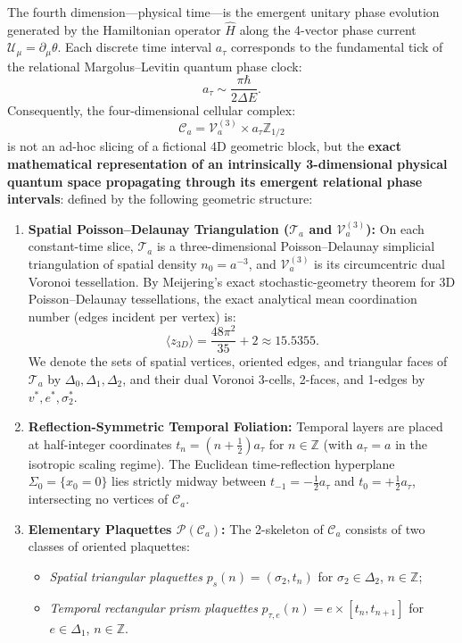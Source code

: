\documentclass[11pt, a4paper]{article}
\theoremstyle{definition}
\theoremstyle{remark}
\begin{document}
The fourth dimension—physical time—is the emergent unitary phase evolution generated by the Hamiltonian operator $\hat{H}$ along the 4-vector phase current $\mathcal{U}_{\mu} = \partial_{\mu}\theta$. Each discrete time interval $a_{\tau}$ corresponds to the fundamental tick of the relational Margolus--Levitin quantum phase clock:
\begin{equation}
  a_{\tau} \sim \frac{\pi\hbar}{2\Delta E}.
\end{equation}
Consequently, the four-dimensional cellular complex:
\begin{equation}
  \mathcal{C}_{a} = \mathcal{V}_{a}^{(3)} \times a_{\tau}\mathbb{Z}_{1/2}
\end{equation}
is not an ad-hoc slicing of a fictional 4D geometric block, but the \textbf{exact mathematical representation of an intrinsically 3-dimensional physical quantum space propagating through its emergent relational phase intervals}:
defined by the following geometric structure:
\begin{enumerate}
  \item \textbf{Spatial Poisson--Delaunay Triangulation ($\mathcal{T}_{a}$ and $\mathcal{V}_{a}^{(3)}$):} On each constant-time slice, $\mathcal{T}_{a}$ is a three-dimensional Poisson--Delaunay simplicial triangulation of spatial density $n_{0} = a^{-3}$, and $\mathcal{V}_{a}^{(3)}$ is its circumcentric dual Voronoi tessellation. By Meijering's exact stochastic-geometry theorem for 3D Poisson--Delaunay tessellations, the exact analytical mean coordination number (edges incident per vertex) is:
  \begin{equation}
    \langle z_{3D} \rangle = \frac{48\pi^{2}}{35} + 2 \approx 15.5355.
  \end{equation}
  We denote the sets of spatial vertices, oriented edges, and triangular faces of $\mathcal{T}_{a}$ by $\Delta_{0}, \Delta_{1}, \Delta_{2}$, and their dual Voronoi 3-cells, 2-faces, and 1-edges by $v^{*}, e^{*}, \sigma_{2}^{*}$.
  \item \textbf{Reflection-Symmetric Temporal Foliation:} Temporal layers are placed at half-integer coordinates $t_{n} = \left(n + \frac{1}{2}\right)a_{\tau}$ for $n \in \mathbb{Z}$ (with $a_{\tau} = a$ in the isotropic scaling regime). The Euclidean time-reflection hyperplane $\Sigma_{0} = \{x_{0} = 0\}$ lies strictly midway between $t_{-1} = -\frac{1}{2}a_{\tau}$ and $t_{0} = +\frac{1}{2}a_{\tau}$, intersecting no vertices of $\mathcal{C}_{a}$.
  \item \textbf{Elementary Plaquettes $\mathcal{P}(\mathcal{C}_{a})$:} The 2-skeleton of $\mathcal{C}_{a}$ consists of two classes of oriented plaquettes:
  \begin{itemize}
    \item \emph{Spatial triangular plaquettes} $p_{s}(n) = (\sigma_{2}, t_{n})$ for $\sigma_{2} \in \Delta_{2}$, $n \in \mathbb{Z}$;
    \item \emph{Temporal rectangular prism plaquettes} $p_{\tau, e}(n) = e \times [t_{n}, t_{n+1}]$ for $e \in \Delta_{1}$, $n \in \mathbb{Z}$.
  \end{itemize}
\end{enumerate}
\end{document}
